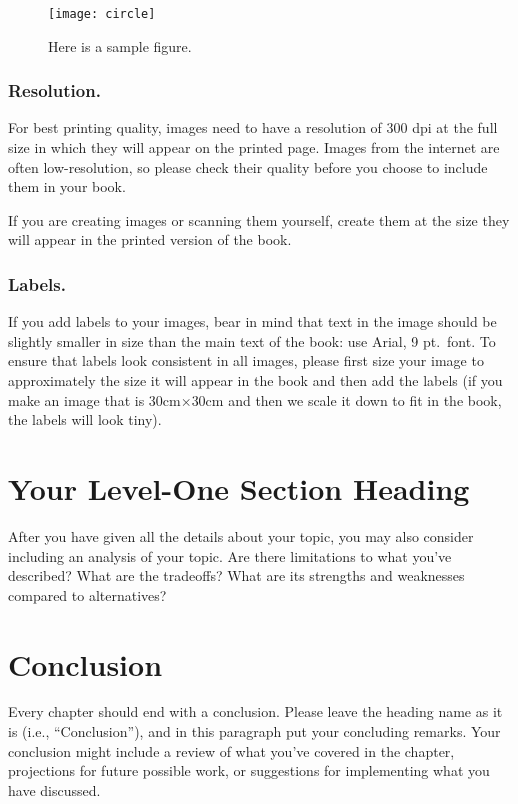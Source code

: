 \begin{figure}[htb]\centering
\texttt{[image: circle]}
\caption{Here is a sample figure.}
\label{YourName:fig2}
\end{figure}

\subsubsection{Resolution.}
For best printing quality, images need to have a resolution of 300 dpi at the full size in which they will appear on the printed page. Images from the internet are often low-resolution, so please check their quality before you choose to include them in your book.

If you are creating images or scanning them yourself, create them at the size they will appear in the printed version of the book.

\subsubsection{Labels.}
If you add labels to your images, bear in mind that text in the image should be slightly smaller in size than the main text of the book: use Arial, 9 pt.\ font. To ensure that labels look consistent in all images, please first size your image to approximately the size it will appear in the book and then add the labels (if you make an image that is 30cm$\times$30cm and then we scale it down to fit in the book, the labels will look tiny).

\section{Your Level-One Section Heading}

After you have given all the details about your topic, you may also consider including an analysis of your topic.
Are there limitations to what you've described? What are the tradeoffs? What are its strengths and weaknesses compared to alternatives?

\section{Conclusion}

Every chapter should end with a conclusion. Please leave the heading name as it is (i.e., ``Conclusion''), and in this paragraph put your concluding remarks. Your conclusion might include a review of what you've covered in the chapter, projections for future possible work, or suggestions for implementing what you have discussed.


